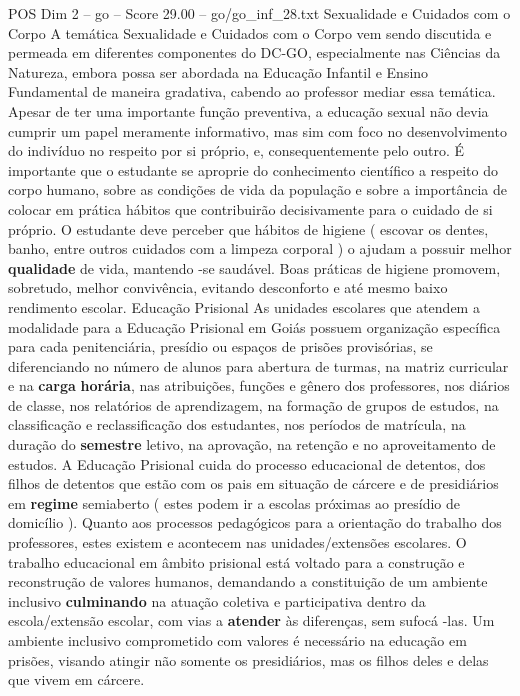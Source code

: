 \begin{textsample}{POS Dim 2 – go – Score 29.00 – go/go\_inf\_28.txt}
Sexualidade e Cuidados com o Corpo A temática Sexualidade e Cuidados com o Corpo vem sendo discutida e permeada em diferentes componentes do DC-GO, especialmente nas Ciências da Natureza, embora possa ser abordada na Educação Infantil e Ensino Fundamental de maneira gradativa, cabendo ao professor mediar essa temática.
Apesar de ter uma importante função preventiva, a educação sexual não devia cumprir um papel meramente informativo, mas sim com foco no desenvolvimento do indivíduo no respeito por si próprio, e, consequentemente pelo outro.
É importante que o estudante se aproprie do conhecimento científico a respeito do corpo humano, sobre as condições de vida da população e sobre a importância de colocar em prática hábitos que contribuirão decisivamente para o cuidado de si próprio.
O estudante deve perceber que hábitos de higiene ( escovar os dentes, banho, entre outros cuidados com a limpeza corporal ) o ajudam a possuir melhor \textbf{qualidade} de vida, mantendo -se saudável.
Boas práticas de higiene promovem, sobretudo, melhor convivência, evitando desconforto e até mesmo baixo rendimento escolar.
Educação Prisional As unidades escolares que atendem a modalidade para a Educação Prisional em Goiás possuem organização específica para cada penitenciária, presídio ou espaços de prisões provisórias, se diferenciando no número de alunos para abertura de turmas, na matriz curricular e na \textbf{carga} \textbf{horária}, nas atribuições, funções e gênero dos professores, nos diários de classe, nos relatórios de aprendizagem, na formação de grupos de estudos, na classificação e reclassificação dos estudantes, nos períodos de matrícula, na duração do \textbf{semestre} letivo, na aprovação, na retenção e no aproveitamento de estudos.
A Educação Prisional cuida do processo educacional de detentos, dos filhos de detentos que estão com os pais em situação de cárcere e de presidiários em \textbf{regime} semiaberto ( estes podem ir a escolas próximas ao presídio de domicílio ).
Quanto aos processos pedagógicos para a orientação do trabalho dos professores, estes existem e acontecem nas unidades/extensões escolares.
O trabalho educacional em âmbito prisional está voltado para a construção e reconstrução de valores humanos, demandando a constituição de um ambiente inclusivo \textbf{culminando} na atuação coletiva e participativa dentro da escola/extensão escolar, com vias a \textbf{atender} às diferenças, sem sufocá -las.
Um ambiente inclusivo comprometido com valores é necessário na educação em prisões, visando atingir não somente os presidiários, mas os filhos deles e delas que vivem em cárcere.

\end{textsample}

